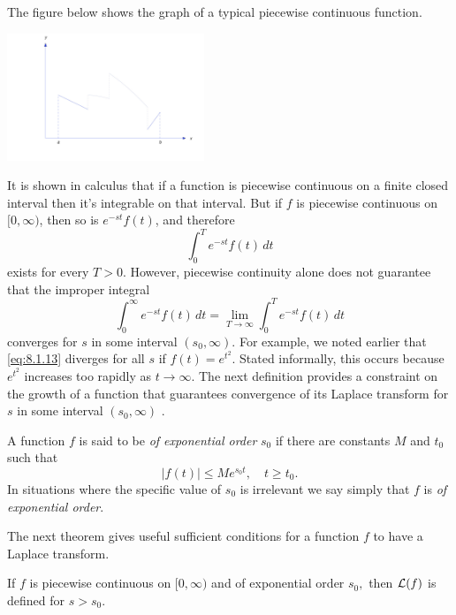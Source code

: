 \documentclass{ximera}
\begin{document}
The figure below shows the graph of a typical piecewise
continuous function.

\begin{image}
 \includegraphics[height=1.5in]{fig080103.jpg}
 \end{image}


It is shown in calculus that if a function is piecewise continuous on
a finite closed interval then it's integrable on that interval. But
if $f$ is piecewise continuous on $[0,\infty)$, then so is $e^{-st}f
(t)$, and therefore
$$
\int_0^T e^{-st}f(t)\,dt
$$
exists for every $T>0$. However, piecewise continuity alone does not
guarantee that the improper integral
\begin{equation}\label{eq:8.1.13}
\int_0^\infty e^{-st}f(t)\,dt=\lim_{T\rightarrow\infty}\int_0^T e^{-st}f(t)\,
dt
\end{equation}
converges for $s$ in some interval $(s_0,\infty)$. For example, we
noted earlier that \eqref{eq:8.1.13} diverges for all $s$ if
$f(t)=e^{t^2}$. Stated informally, this occurs because $e^{t^2}$
increases too rapidly as $t\rightarrow\infty$. The next definition
provides a constraint on the growth of a function that guarantees
convergence of its Laplace transform for $s$ in some interval
$(s_0,\infty)$ .

\begin{definition}\label{thmtype:8.1.5} A
function $f$ is said to be
\textit{of exponential order} $s_0$ if there are constants $M$ and $t_0$
such that
\begin{equation}\label{eq:8.1.14}
|f(t)|\leq Me^{s_0t},\quad t\geq t_0.
\end{equation}
In situations where the specific value of $s_0$
is irrelevant we say simply that $f$ is \textit{of exponential order}.
\end{definition}

The next theorem gives useful sufficient conditions for a function $f$
to have a Laplace transform.  

\begin{theorem}\label{thmtype:8.1.6} If $f$
is piecewise continuous on $[0,\infty)$ and of exponential order $s_0,$
 then ${\cal L}(f)$ is defined for $s>s_0$.
\end{theorem}
\end{document}
